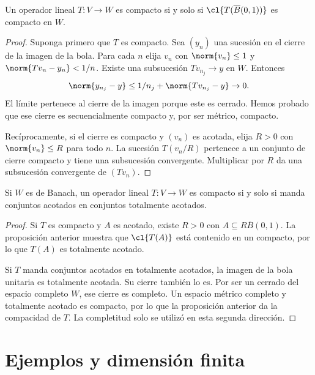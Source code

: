 \begin{proposicion}\label{ch23:bola-compacta}
Un operador lineal $T:V\to W$ es compacto si y solo si $\cl{T(\overline B(0,1))}$ es compacto en $W$.
\end{proposicion}
\begin{proof}
Suponga primero que $T$ es compacto. Sea $(y_n)$ una sucesión en el cierre de la imagen de la bola. Para cada $n$ elija $v_n$ con $\norm{v_n}\leq1$ y $\norm{Tv_n-y_n}<1/n$. Existe una subsucesión $Tv_{n_j}\to y$ en $W$. Entonces
\[
 \norm{y_{n_j}-y}\leq1/n_j+\norm{Tv_{n_j}-y}\to0.
\]
El límite pertenece al cierre de la imagen porque este es cerrado. Hemos probado que ese cierre es secuencialmente compacto y, por ser métrico, compacto.

Recíprocamente, si el cierre es compacto y $(v_n)$ es acotada, elija $R>0$ con $\norm{v_n}\leq R$ para todo $n$. La sucesión $T(v_n/R)$ pertenece a un conjunto de cierre compacto y tiene una subsucesión convergente. Multiplicar por $R$ da una subsucesión convergente de $(Tv_n)$.
\end{proof}

\begin{proposicion}\label{ch23:totalmente-acotado}
Si $W$ es de Banach, un operador lineal $T:V\to W$ es compacto si y solo si manda conjuntos acotados en conjuntos totalmente acotados.
\end{proposicion}
\begin{proof}
Si $T$ es compacto y $A$ es acotado, existe $R>0$ con $A\subseteq R\overline B(0,1)$. La proposición anterior muestra que $\cl{T(A)}$ está contenido en un compacto, por lo que $T(A)$ es totalmente acotado.

Si $T$ manda conjuntos acotados en totalmente acotados, la imagen de la bola unitaria es totalmente acotada. Su cierre también lo es. Por ser un cerrado del espacio completo $W$, ese cierre es completo. Un espacio métrico completo y totalmente acotado es compacto, por lo que la proposición anterior da la compacidad de $T$. La completitud solo se utilizó en esta segunda dirección.
\end{proof}

\section{Ejemplos y dimensión finita}

